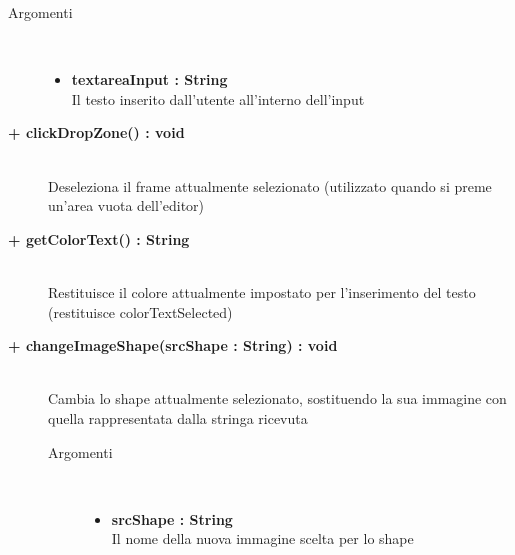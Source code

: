\begin{description}
\begin{description}
		\begin{description}
			\item[Argomenti] \hfill \\
				\begin{itemize}
				
					\item \textbf{textareaInput : String	} \hfill \\
					Il testo inserito dall'utente all'interno dell'input
				\end{itemize}
				
		\end{description}
	\end{description}
	
	\begin{description}
		\item[\textbf{\color{blue}+ clickDropZone() : void	}] \hfill \\
			Deseleziona il frame attualmente selezionato (utilizzato quando si preme un'area vuota dell'editor)
		
	\end{description}
	
	\begin{description}
		\item[\textbf{\color{blue}+ getColorText() : String	}] \hfill \\
			Restituisce il colore attualmente impostato per l'inserimento del testo (restituisce colorTextSelected)
		
	\end{description}
	
	\begin{description}
		\item[\textbf{\color{blue}+ changeImageShape(srcShape : String) : void	 	}] \hfill \\
			Cambia lo shape attualmente selezionato, sostituendo la sua immagine con quella rappresentata dalla stringa ricevuta
			
		\begin{description}
			\item[Argomenti] \hfill \\
				\begin{itemize}
				
					\item \textbf{srcShape : String	} \hfill \\
					Il nome della nuova immagine scelta per lo shape
				\end{itemize}
				

\end{description}
\end{description}
\end{description}
